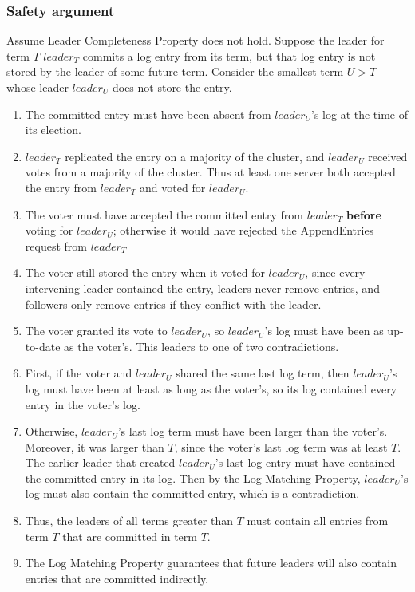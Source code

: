 \documentclass[11pt]{article}
\begin{document}
\subsubsection{Safety argument}
\label{sec:org80fc364}
\label{3.3}
Assume Leader Completeness Property does not hold. Suppose the leader for term \(T\) \(leader_T\)
commits a log entry from its term, but that log entry is not stored by the leader of some future term.
Consider the smallest term \(U>T\) whose leader \(leader_U\) does not store the entry.
\begin{enumerate}
\item The committed entry must have been absent from \(leader_U\)'s log at the time of its election.
\item \(leader_T\) replicated the entry on a majority of the cluster, and \(leader_U\) received votes
from a majority of the cluster. Thus at least one server both accepted the entry from \(leader_T\)
and voted for \(leader_U\).
\item The voter must have accepted the committed entry from \(leader_T\) \textbf{before} voting for \(leader_U\);
otherwise it would have rejected the AppendEntries request from \(leader_T\)
\item The voter still stored the entry when it voted for \(leader_U\), since every intervening leader
contained the entry, leaders never remove entries, and followers only remove entries if they
conflict with the leader.
\item The voter granted its vote to \(leader_U\), so \(leader_U\)'s log must have been as up-to-date as
the voter's. This leaders to one of two contradictions.
\item First, if the voter and \(leader_U\) shared the same last log term, then \(leader_U\)'s log must
have been at least as long as the voter's, so its log contained every entry in the voter's log.
\item Otherwise, \(leader_U\)'s last log term must have been larger than the voter's. Moreover, it was
larger than \(T\), since the voter's last log term was at least \(T\). The earlier leader that
created \(leader_U\)'s last log entry must have contained the committed entry in its log. Then by
the Log Matching Property, \(leader_U\)'s log must also contain the committed entry, which is a contradiction.
\item Thus, the leaders of all terms greater than \(T\) must contain all entries from term \(T\) that are
committed in term \(T\).
\item The Log Matching Property guarantees that future leaders will also contain entries that are
committed indirectly.
\end{enumerate}
\end{document}
